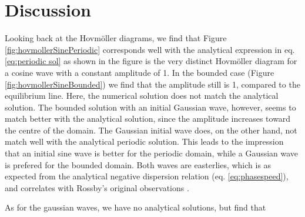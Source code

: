 \section{Discussion}
\label{sec:discussion}

Looking back at the Hovmöller diagrams, we find that Figure \ref{fig:hovmollerSinePeriodic} corresponds well with the analytical expression in eq. \ref{eq:periodic sol} as shown in the figure is the very distinct Hovmöller diagram for a cosine wave with a constant amplitude of 1. In the bounded case (Figure \ref{fig:hovmollerSineBounded}) we find that the amplitude still is 1, compared to the equilibrium line. Here, the numerical solution does not match the analytical solution. The bounded solution with an initial Gaussian wave, however, seems to match better with the analytical solution, since the amplitude increases toward the centre of the domain. The Gaussian initial wave does, on the other hand, not match well with the analytical periodic solution. This leads to the impression that an initial sine wave is better for the periodic domain, while a Gaussian wave is prefered for the bounded domain. Both waves are easterlies, which is as expected from the analytical negative dispersion relation (eq. \ref{eq:phasespeed}), and correlates with Rossby's original observations \citep{rossby}.

As for the gaussian waves, we have no analytical solutions, but find that 